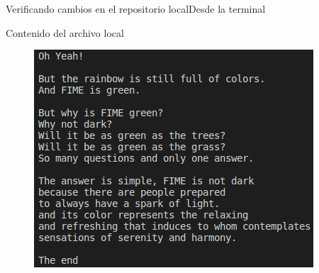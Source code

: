 \documentclass[10pt]{beamer}
\begin{document}
\begin{frame}{Verificando cambios en el repositorio local}{Desde la terminal}

  \begin{block}{Contenido del archivo local}
  
  \begin{figure}[h!]
  \centering
  \includegraphics [scale=0.4]{step11}
  \label{fig:step11}
  \end{figure}
      
  \end{block}
  
\end{frame}
\end{document}
